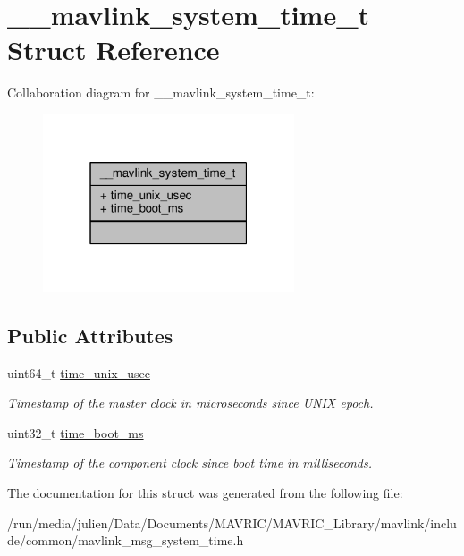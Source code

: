 \hypertarget{struct____mavlink__system__time__t}{\section{\+\_\+\+\_\+mavlink\+\_\+system\+\_\+time\+\_\+t Struct Reference}
\label{struct____mavlink__system__time__t}
}


Collaboration diagram for \+\_\+\+\_\+mavlink\+\_\+system\+\_\+time\+\_\+t\+:
\nopagebreak
\begin{figure}[H]
\begin{center}
\leavevmode
\includegraphics[width=211pt]{struct____mavlink__system__time__t__coll__graph}
\end{center}
\end{figure}
\subsection*{Public Attributes}
\begin{DoxyCompactItemize}
\item 
\hypertarget{struct____mavlink__system__time__t_ae546feebc5c1920448812ff0f2432366}{uint64\+\_\+t \hyperlink{struct____mavlink__system__time__t_ae546feebc5c1920448812ff0f2432366}{time\+\_\+unix\+\_\+usec}}\label{struct____mavlink__system__time__t_ae546feebc5c1920448812ff0f2432366}

\begin{DoxyCompactList}\small\item\em Timestamp of the master clock in microseconds since U\+N\+I\+X epoch. \end{DoxyCompactList}\item 
\hypertarget{struct____mavlink__system__time__t_a262df1d58382c46c44f1612382335c46}{uint32\+\_\+t \hyperlink{struct____mavlink__system__time__t_a262df1d58382c46c44f1612382335c46}{time\+\_\+boot\+\_\+ms}}\label{struct____mavlink__system__time__t_a262df1d58382c46c44f1612382335c46}

\begin{DoxyCompactList}\small\item\em Timestamp of the component clock since boot time in milliseconds. \end{DoxyCompactList}\end{DoxyCompactItemize}


The documentation for this struct was generated from the following file\+:\begin{DoxyCompactItemize}
\item 
/run/media/julien/\+Data/\+Documents/\+M\+A\+V\+R\+I\+C/\+M\+A\+V\+R\+I\+C\+\_\+\+Library/mavlink/include/common/mavlink\+\_\+msg\+\_\+system\+\_\+time.\+h\end{DoxyCompactItemize}

